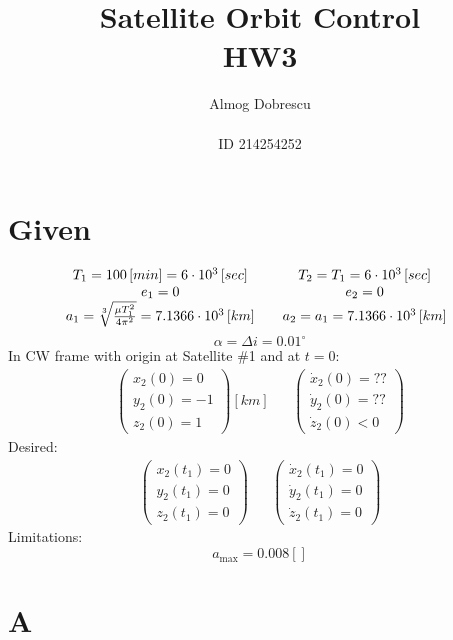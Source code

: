 \documentclass[11pt, a4paper]{article}
\title{Satellite Orbit Control \\ HW3}
\author{Almog Dobrescu\\\\ID 214254252}
\begin{document}
\maketitle

\thispagestyle{empty}
\newpage
\setcounter{page}{1}

\tableofcontents
\vfil
\listoffigures
\newpage

\section{Given}
\begin{equation*}
    \begin{matrix}
        T_1=100\left[min\right] = 6\cdot10^3\left[sec\right] && T_2 = T_1 = 6\cdot10^3\left[sec\right] \\
        e_1 = 0 && e_2 = 0 \\
        a_1 = \sqrt[3]{\frac{\mu T_1^2}{4\pi^2}} = 7.1366\cdot10^3\left[km\right] && a_2 = a_1 = 7.1366\cdot10^3\left[km\right]
    \end{matrix}\\
\end{equation*}
\begin{equation*}
    \alpha=\Delta i = 0.01^\circ
\end{equation*}
In CW frame with origin at Satellite \#1 and at $t=0$:
\begin{equation*}
    \begin{matrix}
    \begin{pmatrix}
        x_2(0)=0 \\ y_2(0)=-1 \\ z_2(0)=1
    \end{pmatrix}\left[km\right] &&
    \begin{pmatrix}
        \dot{x}_2(0)=?? \\ \dot{y}_2(0) = ?? \\ \dot{z}_2(0)<0
    \end{pmatrix}
    \end{matrix}
\end{equation*}
Desired:
\begin{equation*}
    \begin{matrix}
    \begin{pmatrix}
        x_2(t_1)=0 \\ y_2(t_1)=0 \\ z_2(t_1)=0
    \end{pmatrix} &&
    \begin{pmatrix}
        \dot{x}_2(t_1)=0 \\ \dot{y}_2(t_1)=0 \\ \dot{z}_2(t_1)=0
    \end{pmatrix}
    \end{matrix}
\end{equation*}
Limitations:
\begin{equation*}
    a_\text{max} = 0.008[]
\end{equation*}

\section{A}
\end{document}
